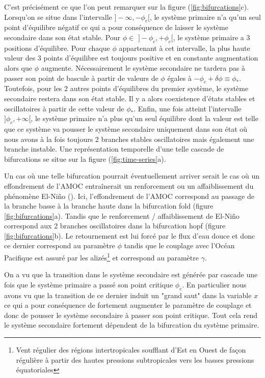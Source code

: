 C'est précisément ce que l'on peut remarquer sur la figure (\ref{fig:bifurcations}c). Lorsqu'on se situe dans l'intervalle $]-\infty, -\phi_c[$, le système primaire n'a qu'un seul point d'équilibre négatif ce qui a pour conséquence de laisser le système secondaire dans son état stable. Pour $\phi \in$ $]-\phi_c, +\phi_c[$, le système primaire a 3 positions d'équilibre. Pour chaque $\phi$ appartenant à cet intervalle, la plus haute valeur des 3 points d'équilibre est toujours positive et en constante augmentation alors que $\phi$ augmente. Nécessairement le système secondaire ne tardera pas à passer son point de bascule à partir de valeurs de $\phi$ égales à $-\phi_c + \delta \phi \equiv \phi_{\ast}$. Toutefois, pour les 2 autres points d'équilibres du premier système, le système secondaire restera dans son état stable. Il y a alors coexistence d'états stables et oscillatoires à partir de cette valeur de $\phi_{\ast}$. Enfin, une fois atteint l'intervalle $]\phi_c, +\infty[$, le système primaire n'a plus qu'un seul équilibre dont la valeur est telle que ce système va pousser le système secondaire uniquement dans son état où nous avons à la fois toujours 2 branches stables oscillatoires mais également une branche instable. Une représentation temporelle d'une telle cascade de bifurcations se situe sur la figure (\ref{fig:time-series}a).

Un cas où une telle bifurcation pourrait éventuellement arriver serait le cas où un effondrement de l'AMOC entraînerait un renforcement ou un affaiblissement du phénomène El-Niño (\cite{timmermann_influence_2007}). Ici, l'effondrement de l'AMOC correspond au passage de la branche basse à la branche haute dans la bifurcation fold (figure \ref{fig:bifurcations}a). Tandis que le renforcement / affaiblissement de El-Niño correspond aux 2 branches oscillatoires dans la bifurcation hopf (figure \ref{fig:bifurcations}b). Le retournement est lui forcé par le flux d'eau douce et donc ce dernier correspond au paramètre $\phi$ tandis que le couplage avec l'Océan Pacifique est assuré par les alizés\footnote{Vent régulier des régions intertropicales soufflant d'Est en Ouest de façon régulière à partir des hautes pressions subtropicales vers les basses pressions équatoriales} et correspond au paramètre $\gamma$.


On a vu que la transition dans le système secondaire est générée par cascade une fois que le système primaire a passé son point critique $\phi_c$. En particulier nous avons vu que la transition de ce dernier induit un "grand saut" dans la variable $x$ ce qui a pour conséquence de fortement augmenter le paramètre de couplage et donc de pousser le système secondaire à passer son point critique. Tout cela rend le système secondaire fortement dépendent de la bifurcation du système primaire.


